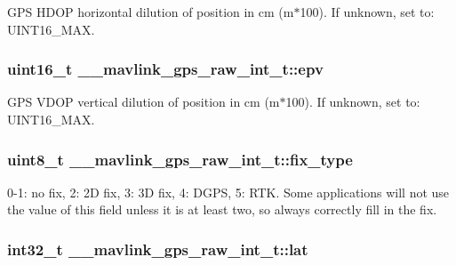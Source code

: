 G\+P\+S H\+D\+O\+P horizontal dilution of position in cm (m$\ast$100). If unknown, set to\+: U\+I\+N\+T16\+\_\+\+M\+A\+X. 

\hypertarget{struct____mavlink__gps__raw__int__t_a0d50bc6cc0e56d9f49885e3e550ec944}{
\subsubsection[{epv}]{\setlength{\rightskip}{0pt plus 5cm}uint16\+\_\+t \+\_\+\+\_\+mavlink\+\_\+gps\+\_\+raw\+\_\+int\+\_\+t\+::epv}}\label{struct____mavlink__gps__raw__int__t_a0d50bc6cc0e56d9f49885e3e550ec944}


G\+P\+S V\+D\+O\+P vertical dilution of position in cm (m$\ast$100). If unknown, set to\+: U\+I\+N\+T16\+\_\+\+M\+A\+X. 

\hypertarget{struct____mavlink__gps__raw__int__t_ae014afb6eea2b6033ebde37c79e120f2}{
\subsubsection[{fix\+\_\+type}]{\setlength{\rightskip}{0pt plus 5cm}uint8\+\_\+t \+\_\+\+\_\+mavlink\+\_\+gps\+\_\+raw\+\_\+int\+\_\+t\+::fix\+\_\+type}}\label{struct____mavlink__gps__raw__int__t_ae014afb6eea2b6033ebde37c79e120f2}


0-\/1\+: no fix, 2\+: 2\+D fix, 3\+: 3\+D fix, 4\+: D\+G\+P\+S, 5\+: R\+T\+K. Some applications will not use the value of this field unless it is at least two, so always correctly fill in the fix. 

\hypertarget{struct____mavlink__gps__raw__int__t_aefd27d0b2d23c58a59b218aa151220d3}{
\subsubsection[{lat}]{\setlength{\rightskip}{0pt plus 5cm}int32\+\_\+t \+\_\+\+\_\+mavlink\+\_\+gps\+\_\+raw\+\_\+int\+\_\+t\+::lat}}\label{struct____mavlink__gps__raw__int__t_aefd27d0b2d23c58a59b218aa151220d3}


